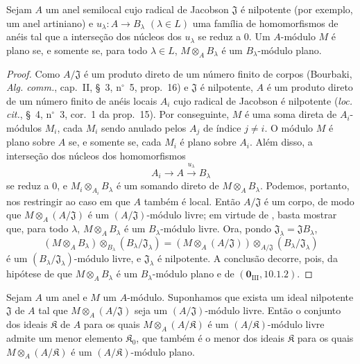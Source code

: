 \begin{corollary}[11.4.3]
\label{IV.11.4.3}
Sejam $A$ um anel semilocal cujo
radical de Jacobson $\mathfrak J$ é
nilpotente (por exemplo, um
anel artiniano) e
$u_\lambda:A\to B_\lambda$
$(\lambda\in L)$ uma família de
homomorfismos de anéis tal que
a interseção dos núcleos dos
$u_\lambda$ se reduz a $0$.
Um $A$-módulo $M$ é plano se, e
somente se, para todo
$\lambda\in L$,
$M\otimes_A B_\lambda$ é um
$B_\lambda$-módulo plano.
\end{corollary}

\begin{proof}
Como $A/\mathfrak J$ é um
produto direto de um número
finito de corpos (Bourbaki,
\emph{Alg. comm.}, cap.~II,
\S~3, n$^\circ$~5, prop.~16)
e $\mathfrak J$ é nilpotente,
$A$ é um produto direto de um
número finito de anéis locais
$A_i$ cujo radical de Jacobson é nilpotente
(\emph{loc. cit.}, \S~4,
n$^\circ$~3, cor.~1 da
prop.~15). Por conseguinte,
$M$ é uma soma direta de
$A_i$-módulos $M_i$, cada
$M_i$ sendo anulado pelos
$A_j$ de índice $j\neq i$.
O módulo $M$ é plano sobre
$A$ se, e somente se, cada
$M_i$ é plano sobre $A_i$.
Além disso, a interseção dos
núcleos dos homomorfismos
\[
A_i\longrightarrow
A\xrightarrow{u_\lambda}B_\lambda
\]
se reduz a $0$, e
$M_i\otimes_{A_i}B_\lambda$
é um somando direto de
$M\otimes_A B_\lambda$.
Podemos, portanto, nos
restringir ao caso em que $A$
também é local. Então
$A/\mathfrak J$ é um corpo,
de modo que
$M\otimes_A(A/\mathfrak J)$
é um $(A/\mathfrak J)$-módulo
livre; em virtude de
, basta mostrar
que, para todo $\lambda$,
$M\otimes_A B_\lambda$ é um
$B_\lambda$-módulo livre.
Ora, pondo
$\mathfrak J_\lambda=
\mathfrak JB_\lambda$,
\[
(M\otimes_A B_\lambda)
\otimes_{B_\lambda}
(B_\lambda/\mathfrak J_\lambda)
=
(M\otimes_A(A/\mathfrak J))
\otimes_{A/\mathfrak J}
(B_\lambda/\mathfrak J_\lambda)
\]
é um
$(B_\lambda/\mathfrak J_\lambda)$-módulo
livre, e $\mathfrak J_\lambda$
é nilpotente. A conclusão
decorre, pois, da hipótese
de que $M\otimes_A B_\lambda$
é um $B_\lambda$-módulo plano
e de
$(\mathbf 0_{\mathrm{III}},10.1.2)$.
\end{proof}

\begin{corollary}[11.4.4]
\label{IV.11.4.4}
Sejam $A$ um anel e $M$ um
$A$-módulo. Suponhamos que
exista um ideal nilpotente
$\mathfrak J$ de $A$ tal que
$M\otimes_A(A/\mathfrak J)$
seja um $(A/\mathfrak J)$-módulo
livre. Então o conjunto dos
ideais $\mathfrak K$ de $A$
para os quais
$M\otimes_A(A/\mathfrak K)$
é um $(A/\mathfrak K)$-módulo
livre admite um menor elemento
$\mathfrak K_0$, que também
é o menor dos ideais
$\mathfrak K$ para os quais
$M\otimes_A(A/\mathfrak K)$
é um $(A/\mathfrak K)$-módulo
plano.
\end{corollary}

